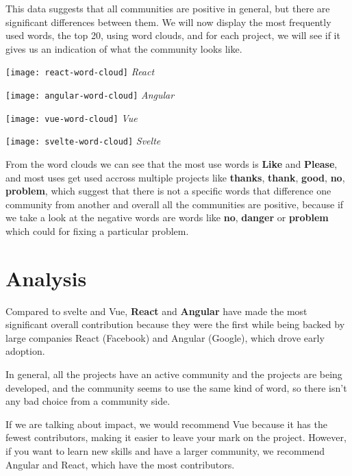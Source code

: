 This data suggests that all communities are positive in general, but there are significant differences between them. We will now display the most frequently used words, the top 20, using word clouds, and for each project, we will see if it gives us an indication of what the community looks like.

\begin{center}
    \texttt{[image: react-word-cloud]}    
    \textit{React}
\end{center}


\begin{center}
    \texttt{[image: angular-word-cloud]}    
    \textit{Angular}
\end{center}


\begin{center}
    \texttt{[image: vue-word-cloud]}    
    \textit{Vue}
\end{center}

\begin{center}
    \texttt{[image: svelte-word-cloud]}    
    \textit{Svelte}
\end{center}

From the word clouds we can see that the most use words is \textbf{Like} and \textbf{Please}, and most uses get used accross multiple projects like \textbf{thanks}, \textbf{thank}, \textbf{good}, \textbf{no}, \textbf{problem}, which suggest that there is not a specific words that difference one community from another and overall all the communities are positive, because if we take a look at the negative words are words like \textbf{no}, \textbf{danger} or \textbf{problem} which could for fixing a particular problem.

\section{Analysis}
Compared to svelte and Vue, \textbf{React} and \textbf{Angular} have made the most significant overall contribution because they were the first while being backed by large companies React (Facebook) and Angular (Google), which drove early adoption.

In general, all the projects have an active community and the projects are being developed, and the community seems to use the same kind of word, so there isn't any bad choice from a community side.

If we are talking about impact, we would recommend Vue because it has the fewest contributors, making it easier to leave your mark on the project. However, if you want to learn new skills and have a larger community, we recommend Angular and React, which have the most contributors.


